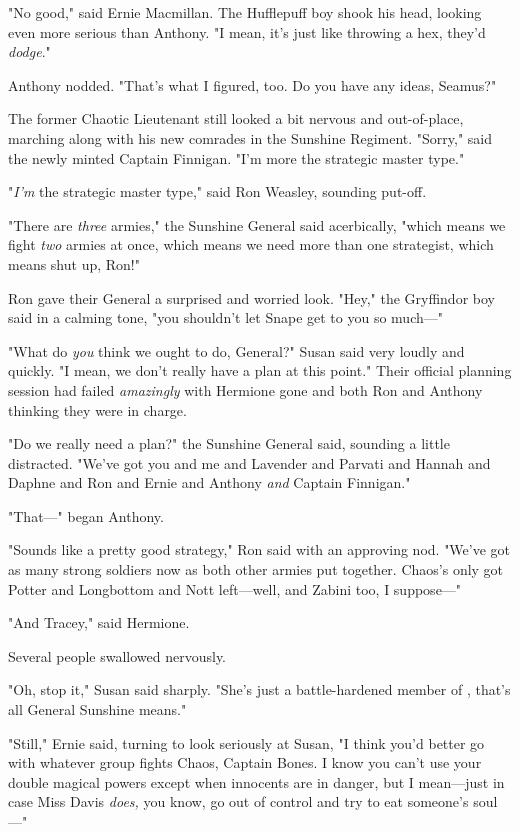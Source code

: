 "No good," said Ernie Macmillan. The Hufflepuff boy shook his head, looking
even more serious than Anthony. "I mean, it's just like throwing a hex, they'd
\emph{dodge}."

Anthony nodded. "That's what I figured, too. Do you have any ideas, Seamus?"

The former Chaotic Lieutenant still looked a bit nervous and out-of-place,
marching along with his new comrades in the Sunshine Regiment. "Sorry," said
the newly minted Captain Finnigan. "I'm more the strategic master type."

"\emph{I'm} the strategic master type," said Ron Weasley, sounding put-off.

"There are \emph{three} armies," the Sunshine General said acerbically, "which
means we fight \emph{two} armies at once, which means we need more than one
strategist, which means shut up, Ron!"

Ron gave their General a surprised and worried look. "Hey," the Gryffindor boy
said in a calming tone, "you shouldn't let Snape get to you so much---"

"What do \emph{you} think we ought to do, General?" Susan said very loudly and
quickly. "I mean, we don't really have a plan at this point." Their official
planning session had failed \emph{amazingly} with Hermione gone and both Ron
and Anthony thinking they were in charge.

"Do we really need a plan?" the Sunshine General said, sounding a little
distracted. "We've got you and me and Lavender and Parvati and Hannah and
Daphne and Ron and Ernie and Anthony \emph{and} Captain Finnigan."

"That---" began Anthony.

"Sounds like a pretty good strategy," Ron said with an approving nod. "We've
got as many strong soldiers now as both other armies put together. Chaos's only
got Potter and Longbottom and Nott left---well, and Zabini too, I suppose---"

"And Tracey," said Hermione.

Several people swallowed nervously.

"Oh, stop it," Susan said sharply. "She's just a battle-hardened member of
\SPHEW, that's all General Sunshine means."

"Still," Ernie said, turning to look seriously at Susan, "I think you'd better
go with whatever group fights Chaos, Captain Bones. I know you can't use your
double magical powers except when innocents are in danger, but I mean---just in
case Miss Davis \emph{does,} you know, go out of control and try to eat
someone's soul---"

